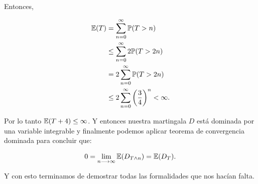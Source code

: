 	Entonces,
	
    \begin{align}
		\mathbb{E}(T) 	&= 		\sum_{n=0}^\infty \mathbb{P}(T > n) \\
				&\leq 	\sum_{n=0}^\infty 2\mathbb{P}(T > 2n) \\
				&= 		2 \sum_{n=0}^\infty \mathbb{P}(T > 2n) \\
				&\leq 	2 \sum_{n=0}^\infty \bigg(\frac{3}{4}\bigg)^{n} < \infty.
	\end{align}\pn
	
	Por lo tanto $\mathbb{E}(T + 4) \leq \infty$. Y entonces nuestra martingala $D$ está dominada por una variable integrable y finalmente
	podemos aplicar teorema de convergencia dominada para concluir que:
	
    \begin{align}
		0 = \lim_{n \longrightarrow \infty} \mathbb{E}(D_{T \wedge n}) = \mathbb{E}(D_T).
	\end{align}\pn
	
	Y con esto terminamos de demostrar todas las formalidades que nos hacían falta.